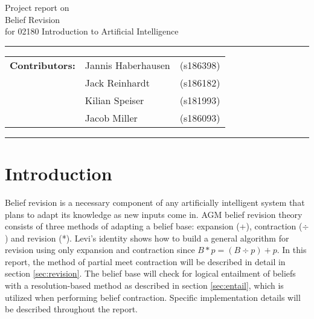 \documentclass[a4paper,10pt]{article}
\begin{document}
\begin{center}
Project report on\\
\vspace{0.5cm}
{{\Large \sc Belief Revision}} \\
\vspace{0.5cm} for 02180 Introduction to Artificial Intelligence
\end{center}
\rule{\textwidth}{0.5pt}
\begin{description}
\item\begin{tabular}{rll}
    \textbf{Contributors:}  & Jannis Haberhausen  & (s186398) \\
                            & Jack Reinhardt      & (s186182) \\
                            & Kilian Speiser      & (s181993) \\
                            & Jacob Miller        & (s186093) \\
\end{tabular}
\end{description}
\rule{\textwidth}{1pt}

\tableofcontents
\newpage

\section{Introduction}
\label{sec:intro}
Belief revision is a necessary component of any artificially intelligent system that plans to adapt its knowledge as new inputs come in. AGM belief revision theory
consists of three methods of adapting a belief base: expansion (+), contraction ($\div$) and revision (*). Levi's identity shows how to build a general algorithm for revision
using only expansion and contraction since $B*p=(B\div p)+p$. In this report, the method of partial meet contraction will be described in detail in section \ref{sec:revision}.
The belief base will check for logical entailment of beliefs with a resolution-based method as described in section \ref{sec:entail}, which is utilized when performing
belief contraction. Specific implementation details will be described throughout the report.
\end{document}

